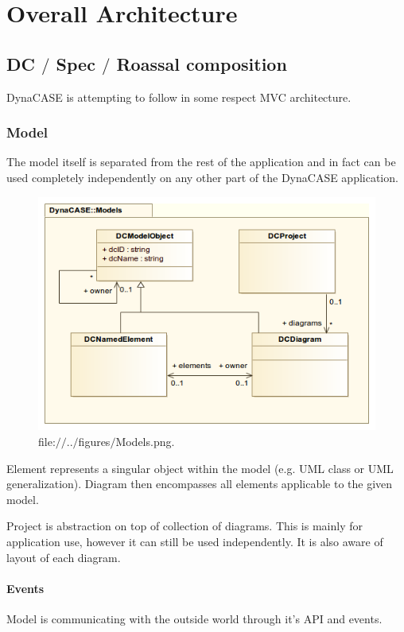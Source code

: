 \documentclass[a4paper,10pt,twoside]{book}
\begin{document}
\fi
\sloppy

\chapter{ Overall Architecture}\section{ DC $/$ Spec $/$ Roassal composition}
DynaCASE is attempting to follow in some respect MVC architecture.
\subsection{ Model}
The model itself is separated from the rest of the application and in fact can be used completely independently on any other part of the DynaCASE application.


\begin{figure}

\begin{center}
\includegraphics[width=1.0\textwidth]{../figures/Models.png}\caption{file:$/$$/$..$/$figures$/$Models.png.\label{../figures/Models.png}}\end{center}
\end{figure}

Element represents a singular object within the model (e.g. UML class or UML generalization). Diagram then encompasses all elements applicable to the given model.

Project is abstraction on top of collection of diagrams. This is mainly for application use, however it can still be used independently. It is also aware of layout of each diagram.
\subsubsection{ Events}
Model is communicating with the outside world through it's API and events.
\end{document}
